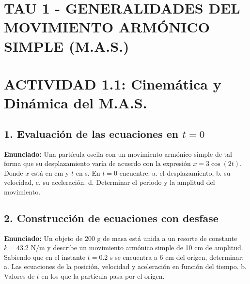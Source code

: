 \documentclass[12pt, letterpaper]{article}
\begin{document}
\newpage
\section*{TAU 1 - GENERALIDADES DEL MOVIMIENTO ARMÓNICO SIMPLE (M.A.S.)}

\section*{ACTIVIDAD 1.1: Cinemática y Dinámica del M.A.S.}

\subsection*{1. Evaluación de las ecuaciones en $t=0$}
\noindent \textbf{Enunciado:} Una partícula oscila con un movimiento armónico simple de tal forma que su desplazamiento varía de acuerdo con la expresión $x=3 \cos(2t)$. Donde $x$ está en cm y $t$ en s. En $t=0$ encuentre: a. el desplazamiento, b. su velocidad, c. su aceleración. d. Determinar el periodo y la amplitud del movimiento.


\subsection*{2. Construcción de ecuaciones con desfase}
\noindent \textbf{Enunciado:} Un objeto de 200 g de masa está unida a un resorte de constante $k=43.2 \text{ N/m}$ y describe un movimiento armónico simple de 10 cm de amplitud. Sabiendo que en el instante $t=0.2$ s se encuentra a 6 cm del origen, determinar: a. Las ecuaciones de la posición, velocidad y aceleración en función del tiempo. b. Valores de $t$ en los que la partícula pasa por el origen.
\end{document}
